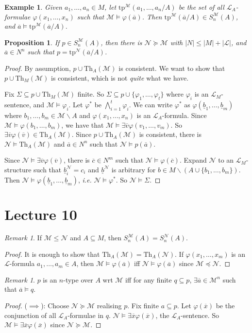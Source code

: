 \documentclass[]{article}
\theoremstyle{custhm}
\theoremstyle{cusdef}
\theoremstyle{custhm}
\theoremstyle{custhm}
\theoremstyle{custhm}
\newtheorem{prop}[theorem]{Proposition}
\theoremstyle{ex}
\newtheorem{ex}[theorem]{Example}
\theoremstyle{custhm}
\theoremstyle{cusdef}
\theoremstyle{remark}
\theoremstyle{remark}
\newtheorem{remark}[theorem]{Remark}
\renewcommand{\L}{\mathcal{L}}
\renewcommand{\it}[1]{\textit{#1}}
\newcommand{\M}{\mathcal{M}}
\renewcommand{\phi}{\varphi}
\renewcommand{\bar}{\overline}
\newcommand{\Th}{\textrm{Th}}
\newcommand{\tp}{\textrm{tp}}
\newcommand{\N}{\mathcal{N}}
\renewcommand{\subset}{\subseteq}
\begin{document}
\begin{ex}
Given $a_1,\dots,a_n\in M$, let $\textrm{tp}^\M(a_1,\dots,a_n/A)$ be the set of all $\L_A$-formulae $\phi(x_1,\dots,x_n)$ such that $\M\models \phi(\bar{a})$. Then $\tp^\M(\bar{a}/A)\in S_n^\M(A)$, and $\bar{a}\models \tp^\M(\bar{a}/A)$.
\end{ex}
\begin{prop}
If $p \in S_n^\M(A)$, then there is $\N\succeq\M$ with $|N| \le |M| + |\L|$, and $\bar{a}\in N^n$ such that $p = \tp^\N(\bar{a}/A)$.
\end{prop}
\begin{proof}
By assumption, $p\cup\Th_A(\M)$ is consistent. We want to show that $p \cup \Th_M(\M)$ is consistent, which is not \it{quite} what we have.

Fix $\Sigma \subset p \cup \Th_M(\M)$ finite. So $\Sigma \subset p \cup \{\phi_1,\dots,\phi_t\}$ where $\phi_i$ is an $\L_M$-sentence, and $\M\models \phi_i$. Let $\phi^\ast$ be $\bigwedge_{i=1}^{t}\phi_i$. We can write $\phi^\ast$ as $\phi(\underline{b}_1,\dots,\underline{b}_m)$ where $b_1,\dots,b_m\in \M\backslash A$ and $\phi(x_1,\dots,x_n)$ is an $\L_A$-formula. Since $\M\models \phi(b_1,\dots,b_m)$, we have that $\M\models \exists \bar{v}\phi(v_1,\dots,v_m)$. So $\exists \bar{v}\phi(\bar{v})\in \Th_A(\M)$. Since $p\cup \Th_A(\M)$ is consistent, there is $\N\models \Th_A(\M)$ and $\bar{a} \in N^n$ such that $\N\models p(\bar{a})$.

Since $\N\models \exists \bar{v}\phi(\bar{v})$, there is $\bar{c} \in N^m$ such that $\N\models \phi(\bar{c})$. Expand $\N$ to an $\L_M$-structure such that $\underline{b}_i^\N = c_i$ and $\underline{b}^\N$ is arbitrary for $b\in M\backslash (A\cup \{b_1,\dots,b_m\})$. Then $\N\models \phi(\underline{b}_1,\dots,\underline{b}_m)$, \it{i.e.} $\N\models \phi^\ast$. So $\N\models \Sigma$.
\end{proof}

\section{Lecture 10}

\begin{remark}
If $\M\le \N$ and $A \subset M$, then $S_n^\M(A) = S_n^\N(A)$.
\end{remark}
\begin{proof}
It is enough to show that $\Th_A(\M) = \Th_A(\N)$. If $\phi(x_1,\dots,x_m)$ is an $\L$-formula $a_1,\dots,a_m\in A$, then $\M\models \phi(\bar{a})$ iff $\N\models \phi(\bar{a})$ since $\M\preceq \N$.
\end{proof}
\begin{remark}
	$p$ is an $n$-type over $A$ wrt $\M$ iff for any finite $q \subset p$, $\exists \bar{a}\in \M^n$ such that $\bar{a}\models q$.
\end{remark}
\begin{proof}
($\implies$): Choose $\N\succeq \M$ realising $p$. Fix finite $a \subset p$. Let $\phi(\bar{x})$ be the conjunction of all $\L_A$-formulae in $q$. $\N\models \exists \bar{x}\phi(\bar{x})$, the $\L_A$-sentence. So $\M\models \exists \bar{x}\phi(\bar{x})$ since $\N\succeq \M$.
\end{proof}
\end{document}
